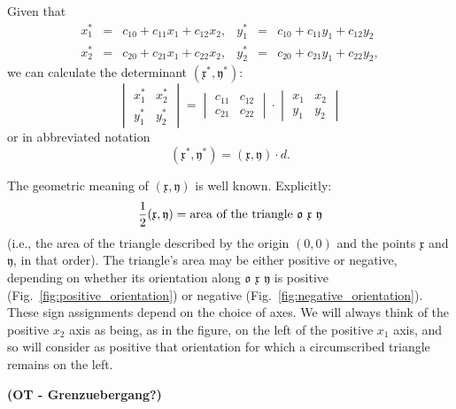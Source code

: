 \documentclass[11pt]{book} \usepackage{amssymb}
\newcommand{\myvec}[1]{\mathfrak{#1}}
\begin{document}
Given that
\begin{equation}
  \label{eq:xy_affinity}
  \begin{array}{rclrcl}
    x_1^* &=& c_{10}+c_{11}x_1+c_{12}x_2, &y_1^* &=& c_{10}+c_{11}y_1+c_{12}y_2\\
    x_2^* &=& c_{20}+c_{21}x_1+c_{22}x_2, &y_2^* &=& c_{20}+c_{21}y_1+c_{22}y_2,
  \end{array}  
\end{equation}
we can calculate the determinant $(\myvec{x}^*,\myvec{y}^*)$:
\begin{equation}
  \label{eq:xy_det_transformed}
  \begin{vmatrix}x_1^*&x_2^*\\y_1^*&y_2^*\end{vmatrix}=\begin{vmatrix}c_{11}&c_{12}\\c_{21}&c_{22}\end{vmatrix}\cdot\begin{vmatrix}x_1&x_2\\y_1&y_2\end{vmatrix}
\end{equation}
or in abbreviated notation
\begin{equation}
  \label{eq:xy_det_transformed_short}
  (\myvec{x}^*,\myvec{y}^*)=(\myvec{x},\myvec{y})\cdot d.
\end{equation}

The geometric meaning of $(\myvec{x},\myvec{y})$ is well known. Explicitly:
\begin{equation}
  \label{eq:triangle_area}
  {1\over 2}(\myvec{x},\myvec{y})=\mbox{area of the triangle $\myvec{o}$ $\myvec{x}$ $\myvec{y}$}
\end{equation}
(i.e., the area of the triangle described by the origin $(0,0)$ and the 
points $\myvec{x}$ and $\myvec{y}$, in that order). The triangle's area may
be either positive or negative, depending on whether its orientation 
along $\myvec{o}$ $\myvec{x}$ $\myvec{y}$ is
positive (Fig.~\ref{fig:positive_orientation}) or negative 
(Fig.~\ref{fig:negative_orientation}). These sign assignments depend on the
choice of axes. We will always think of the positive $x_2$ axis as being,
as in the figure, on the left of the positive $x_1$ axis, and so will consider 
as positive that orientation for which a circumscribed triangle remains on 
the left.

{\bf (OT - Grenzuebergang?)}
\end{document}
